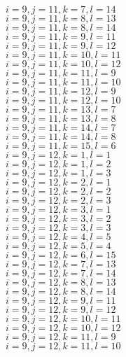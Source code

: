 \documentclass[14pt]{article}
\begin{document}
    $i=9,j=11,k=7,l=14 $ \\ 
    $i=9,j=11,k=8,l=13 $ \\ 
    $i=9,j=11,k=8,l=14 $ \\ 
    $i=9,j=11,k=9,l=11 $ \\ 
    $i=9,j=11,k=9,l=12 $ \\ 
    $i=9,j=11,k=10,l=11 $ \\ 
    $i=9,j=11,k=10,l=12 $ \\ 
    $i=9,j=11,k=11,l=9 $ \\ 
    $i=9,j=11,k=11,l=10 $ \\ 
    $i=9,j=11,k=12,l=9 $ \\ 
    $i=9,j=11,k=12,l=10 $ \\ 
    $i=9,j=11,k=13,l=7 $ \\ 
    $i=9,j=11,k=13,l=8 $ \\ 
    $i=9,j=11,k=14,l=7 $ \\ 
    $i=9,j=11,k=14,l=8 $ \\ 
    $i=9,j=11,k=15,l=6 $ \\ 
    $i=9,j=12,k=1,l=1 $ \\ 
    $i=9,j=12,k=1,l=2 $ \\ 
    $i=9,j=12,k=1,l=3 $ \\ 
    $i=9,j=12,k=2,l=1 $ \\ 
    $i=9,j=12,k=2,l=2 $ \\ 
    $i=9,j=12,k=2,l=3 $ \\ 
    $i=9,j=12,k=3,l=1 $ \\ 
    $i=9,j=12,k=3,l=2 $ \\ 
    $i=9,j=12,k=3,l=3 $ \\ 
    $i=9,j=12,k=4,l=5 $ \\ 
    $i=9,j=12,k=5,l=4 $ \\ 
    $i=9,j=12,k=6,l=15 $ \\ 
    $i=9,j=12,k=7,l=13 $ \\ 
    $i=9,j=12,k=7,l=14 $ \\ 
    $i=9,j=12,k=8,l=13 $ \\ 
    $i=9,j=12,k=8,l=14 $ \\ 
    $i=9,j=12,k=9,l=11 $ \\ 
    $i=9,j=12,k=9,l=12 $ \\ 
    $i=9,j=12,k=10,l=11 $ \\ 
    $i=9,j=12,k=10,l=12 $ \\ 
    $i=9,j=12,k=11,l=9 $ \\ 
    $i=9,j=12,k=11,l=10 $ \\ 
\end{document}

